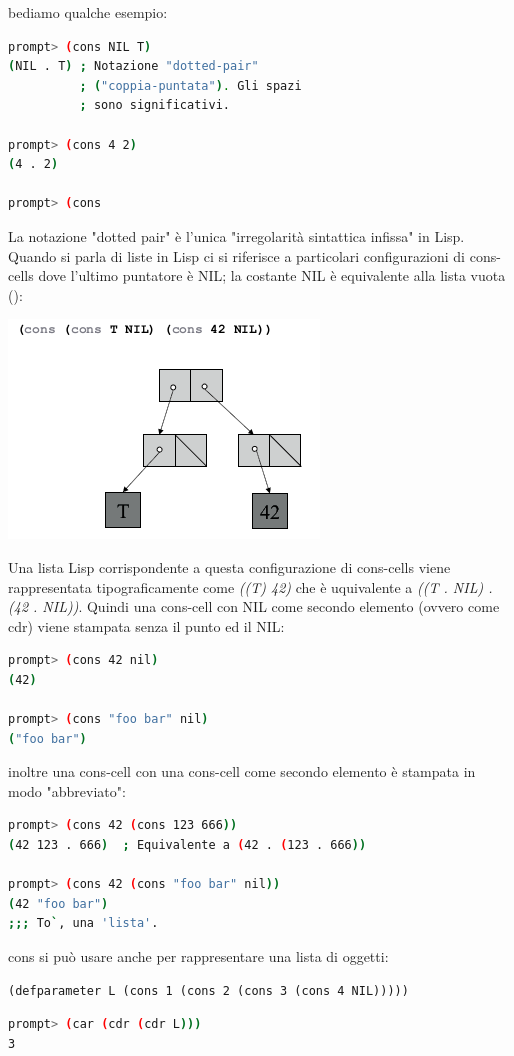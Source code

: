 \documentclass[a4paper,12pt, oneside]{book}
\begin{document}
bediamo qualche esempio:
\begin{shaded}
	\begin{lstlisting}[language=bash]
prompt> (cons NIL T)
(NIL . T) ; Notazione "dotted-pair"
          ; ("coppia-puntata"). Gli spazi
          ; sono significativi.
          
prompt> (cons 4 2)
(4 . 2)

prompt> (cons
\end{lstlisting}
\end{shaded}
La notazione "dotted pair" è l'unica "irregolarità sintattica infissa" in Lisp.
\\
Quando si parla di liste in Lisp ci si riferisce a particolari configurazioni di cons-cells dove l'ultimo puntatore è NIL; la costante NIL è equivalente alla lista vuota ():
\begin{center}
	\includegraphics[scale=0.7]{img/cons3.png}
\end{center}
Una lista Lisp corrispondente a questa configurazione di cons-cells viene rappresentata tipograficamente come \textit{((T) 42)} che è uquivalente a \textit{((T . NIL) . (42 . NIL))}. Quindi una cons-cell con NIL come secondo
elemento (ovvero come cdr) viene stampata senza il punto ed il NIL:
\begin{shaded}
	\begin{lstlisting}[language=bash]
prompt> (cons 42 nil)
(42)

prompt> (cons "foo bar" nil)
("foo bar")
\end{lstlisting}
\end{shaded}
inoltre una cons-cell con una cons-cell come secondo elemento è stampata in modo "abbreviato":
\begin{shaded}
	\begin{lstlisting}[language=bash]
prompt> (cons 42 (cons 123 666))
(42 123 . 666)  ; Equivalente a (42 . (123 . 666))

prompt> (cons 42 (cons "foo bar" nil))
(42 "foo bar")
;;; To`, una 'lista'.
\end{lstlisting}
\end{shaded}
cons si può usare anche per rappresentare una lista di oggetti:
\begin{verbatim}
(defparameter L (cons 1 (cons 2 (cons 3 (cons 4 NIL)))))
\end{verbatim}
\begin{shaded}
	\begin{lstlisting}[language=bash]
prompt> (car (cdr (cdr L)))
3
\end{lstlisting}
\end{shaded}
\end{document}
